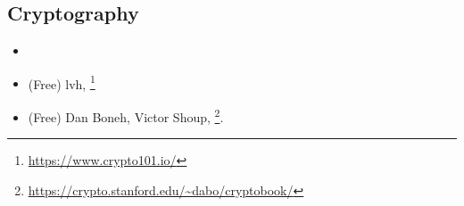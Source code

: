\subsection{Cryptography}
\label{crypto_books}

\begin{itemize}
\item \Schneier{}

\item (Free) lvh, \footnote{\AlsoAvailableAs \url{https://www.crypto101.io/}}

\item (Free) Dan Boneh, Victor Shoup, \footnote{\AlsoAvailableAs \url{https://crypto.stanford.edu/~dabo/cryptobook/}}.
\end{itemize}

